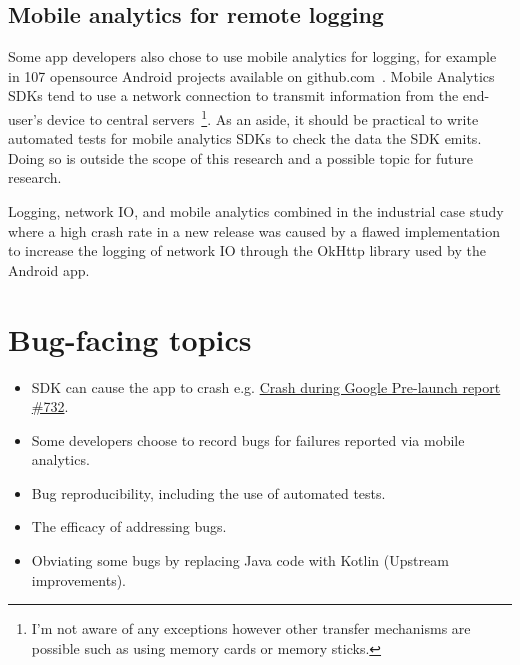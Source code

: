 \subsection{Mobile analytics for remote logging}
Some app developers also chose to use mobile analytics for logging, for example in 107 opensource Android projects available on github.com~\citep{harty2021_logging_practices_with_mobile_analytics}. Mobile Analytics SDKs tend to use a network connection to transmit information from the end-user's device to central servers~\footnote{I'm not aware of any exceptions however other transfer mechanisms are possible such as using memory cards or memory sticks.}. As an aside, it should be practical to write automated tests for mobile analytics SDKs to check the data the SDK emits. Doing so is outside the scope of this research and a possible topic for future research. %

Logging, network IO, and mobile analytics combined in the industrial case study where a high crash rate in a new release was caused by a flawed implementation to increase the logging of network IO through the OkHttp library used by the Android app. 

\section{Bug-facing topics}

\begin{itemize}
    \itemsep0em 
    \item SDK can cause the app to crash e.g. \href{https://github.com/segmentio/analytics-android/issues/732}{Crash during Google Pre-launch report \#732}.
    \item Some developers choose to record bugs for failures reported via mobile analytics.
    \item Bug reproducibility, including the use of automated tests.
    \item The efficacy of addressing bugs.
    \item Obviating some bugs by replacing Java code with Kotlin (Upstream improvements).
\end{itemize}


